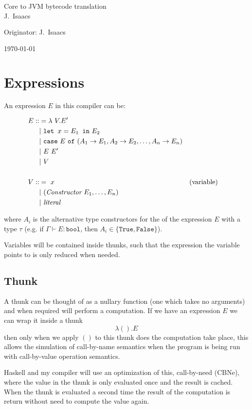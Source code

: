 \documentclass[12pt,a4paper,twoside]{article}
\begin{document}
\begin{center}
  \Large
  Core to JVM bytecode translation\\[4mm]

  J.~Isaacs

  Originator: J.~Isaacs 

  \today
\end{center}

\section{Expressions}

An expression $E$ in this compiler can be:

\begin{align*}
E ::&= \lambda\ V . E' \\
   &|\ \texttt{let } x = E_1 \texttt{ in} \ E_2\\ 
   &|\ \texttt{case}\ E \ \texttt{of} \ (A_1 \rightarrow E_1, A_2 \rightarrow E_2, \mathellipsis, A_n \rightarrow E_n)\\
   &|\ E\ E'\\
   &|\ V\\\\
V ::&=\ x &&\text{(variable)}\\
   &|\ (\textit{Constructor}\ E_1, \mathellipsis, E_n )\\
   &|\ \textit{literal}
\end{align*}

where $A_i$ is the alternative type constructors for the of the expression $E$ with a type $\tau$
(e.g. if $\Gamma \vdash E : \texttt{bool}$, then $A_i \in \{ \texttt{True},  \texttt{False} \}$).


Variables will be contained inside thunks, such that the expression the variable points to is only reduced 
when needed.

\subsection{Thunk}

A thunk can be thought of as a nullary function (one which takes no arguments) and when required will 
perform a computation. If we have an expression $E$ we can wrap it inside a thunk \[ \lambda (). E \] then 
only when we apply $()$ to this thunk does the computation take place, this allows the
simulation of call-by-name semantics
when the program is being run with call-by-value operation semantics. 

Haskell and my compiler will use an optimization of this, call-by-need (CBNe), where the value in the thunk is only evaluated once and the 
result is cached. When the thunk is evaluated a second time the result of the computation is return without need to compute the value again.
\end{document}
